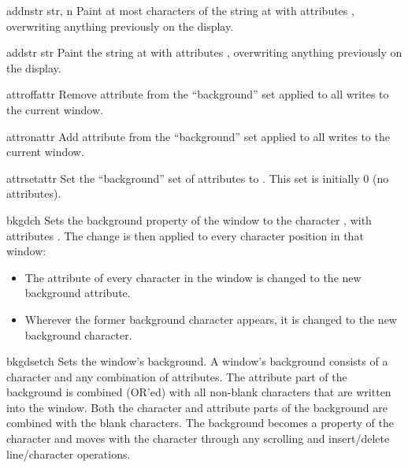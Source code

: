 \begin{methoddesc}{addnstr}{ str, n}
Paint at most  characters of the 
string  at  with attributes
, overwriting anything previously on the display.
\end{methoddesc}

\begin{methoddesc}{addstr}{ str}
Paint the string  at  with attributes
, overwriting anything previously on the display.
\end{methoddesc}

\begin{methoddesc}{attroff}{attr}
Remove attribute  from the ``background'' set applied to all
writes to the current window.
\end{methoddesc}

\begin{methoddesc}{attron}{attr}
Add attribute  from the ``background'' set applied to all
writes to the current window.
\end{methoddesc}

\begin{methoddesc}{attrset}{attr}
Set the ``background'' set of attributes to .  This set is
initially 0 (no attributes).
\end{methoddesc}

\begin{methoddesc}{bkgd}{ch}
Sets the background property of the window to the character ,
with attributes .  The change is then applied to every
character position in that window:
\begin{itemize}
\item  
The attribute of every character in the window  is
changed to the new background attribute.
\item
Wherever  the  former background character appears,
it is changed to the new background character.
\end{itemize}

\end{methoddesc}

\begin{methoddesc}{bkgdset}{ch}
Sets the window's background.  A window's background consists of a
character and any combination of attributes.  The attribute part of
the background is combined (OR'ed) with all non-blank characters that
are written into the window.  Both the character and attribute parts
of the background are combined with the blank characters.  The
background becomes a property of the character and moves with the
character through any scrolling and insert/delete line/character
operations.
\end{methoddesc}

